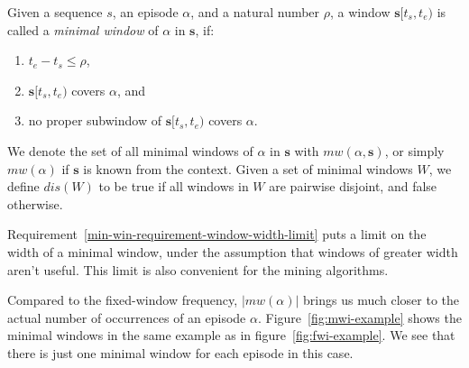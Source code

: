 \begin{definition}
Given a sequence $ s $, an episode $ \alpha $, and a natural number $ \rho $, a window $ \boldsymbol{s}[t_s, t_e) $ is called a \emph{minimal window} of $ \alpha $ in $ \boldsymbol{s} $, if:
\begin{enumerate}
\item $ t_e - t_s \leq \rho $, \label{min-win-requirement-window-width-limit}
\item $ \boldsymbol{s}[t_s, t_e) $ covers $ \alpha $, and
\item no proper subwindow of $ \boldsymbol{s}[t_s, t_e) $ covers $ \alpha $.
\end{enumerate}

We denote the set of all minimal windows of $ \alpha $ in $ \boldsymbol{s} $ with $ mw(\alpha, \boldsymbol{s}) $, or simply $ mw(\alpha) $ if $ \boldsymbol{s} $ is known from the context. Given a set of minimal windows $ W $, we define $ dis(W) $ to be true if all windows in $ W $ are pairwise disjoint, and false otherwise.
\end{definition}

Requirement~\ref{min-win-requirement-window-width-limit} puts a limit on the width of a minimal window, under the assumption that windows of greater width aren't useful. This limit is also convenient for the mining algorithms.

Compared to the fixed-window frequency, $ | mw(\alpha) | $ brings us much closer to the actual number of occurrences of an episode $ \alpha $. Figure~\ref{fig:mwi-example} shows the minimal windows in the same example as in figure~\ref{fig:fwi-example}. We see that there is just one minimal window for each episode in this case.

